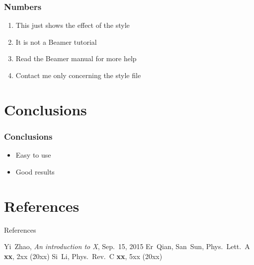 \documentclass[10pt,aspectratio=169,mathserif]{beamer}
\begin{document}
\begin{frame}
  \frametitle{Numbers}
	 \begin{enumerate}
	    \item This just shows the effect of the style
	    \item It is not a Beamer tutorial
	    \item Read the Beamer manual for more help
	    \item Contact me only concerning the style file
	  \end{enumerate}
\end{frame}

\section{Conclusions}
\begin{frame}
  \frametitle{Conclusions}

  \begin{itemize}
    \item Easy to use
    \item Good results
  \end{itemize}
\end{frame}

\section{References}
\begin{frame}{References}
\begin{thebibliography}{99} 
 Yi~Zhao, {\sl An introduction to X}, Sep.~15, 2015
 Er~Qian, San~Sun, 
Phys.\ Lett.\ A {\bf xx}, 2xx (20xx)   
 Si~Li, Phys.\ Rev.\ C {\bf xx}, 5xx (20xx) 

\end{thebibliography}
\end{frame}
\end{document}
